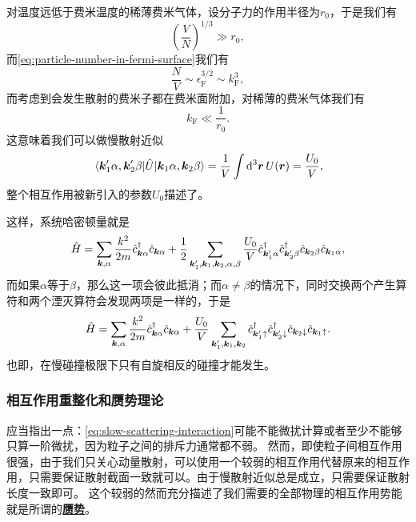 \documentclass[hyperref, UTF8, a4paper]{ctexart}
\newcommand{\concept}[1]{\underline{\textbf{#1}}}
\begin{document}
对温度远低于费米温度的稀薄费米气体，设分子力的作用半径为$r_0$，于是我们有
\[
    \left( \frac{V}{N} \right)^{1/3} \gg r_0,
\]
而\eqref{eq:particle-number-in-fermi-surface}我们有
\[
    \frac{N}{V} \sim \epsilon_\text{F}^{3/2} \sim k_\text{F}^{3},
\]
而考虑到会发生散射的费米子都在费米面附加，对稀薄的费米气体我们有
\begin{equation}
    k_\text{F} \ll \frac{1}{r_0}.
\end{equation}
这意味着我们可以做慢散射近似
\begin{equation}
    \mel*{\vb*{k}_1' \alpha, \vb*{k}_2' \beta}{\hat{U}}{\vb*{k}_1 \alpha, \vb*{k}_2 \beta} = \frac{1}{V} \int \dd[3]{\vb*{r}} U(\vb*{r}) = \frac{U_0}{V},
    \label{eq:slow-scattering-interaction}
\end{equation}
整个相互作用被新引入的参数$U_0$描述了。

这样，系统哈密顿量就是
\[
    \hat{H} = \sum_{\vb*{k}, \alpha} \frac{k^2}{2m} \hat{c}^\dagger_{\vb*{k} \alpha} \hat{c}_{\vb*{k} \alpha} + \frac{1}{2} \sum_{\vb*{k}_1', \vb*{k}_1, \vb*{k}_2, \alpha, \beta} \frac{U_0}{V} \hat{c}^\dagger_{\vb*{k}'_1 \alpha} \hat{c}^\dagger_{\vb*{k}'_2 \beta} \hat{c}_{\vb*{k}_2 \beta} \hat{c}_{\vb*{k}_1 \alpha},
\]
而如果$\alpha$等于$\beta$，那么这一项会彼此抵消；而$\alpha \neq \beta$的情况下，同时交换两个产生算符和两个湮灭算符会发现两项是一样的，于是
\begin{equation}
    \hat{H} = \sum_{\vb*{k}, \alpha} \frac{k^2}{2m} \hat{c}^\dagger_{\vb*{k} \alpha} \hat{c}_{\vb*{k} \alpha} + \frac{U_0}{V} \sum_{\vb*{k}_1', \vb*{k}_1, \vb*{k}_2} \hat{c}^\dagger_{\vb*{k}'_1 \uparrow} \hat{c}^\dagger_{\vb*{k}'_2 \downarrow} \hat{c}_{\vb*{k}_2 \downarrow} \hat{c}_{\vb*{k}_1 \uparrow}.
\end{equation}
也即，在慢碰撞极限下只有自旋相反的碰撞才能发生。

\subsubsection{相互作用重整化和赝势理论}

应当指出一点：\eqref{eq:slow-scattering-interaction}可能不能微扰计算或者至少不能够只算一阶微扰，因为粒子之间的排斥力通常都不弱。
然而，即使粒子间相互作用很强，由于我们只关心动量散射，可以使用一个较弱的相互作用代替原来的相互作用，只需要保证散射截面一致就可以。由于慢散射近似总是成立，只需要保证散射长度一致即可。
这个较弱的然而充分描述了我们需要的全部物理的相互作用势能就是所谓的\concept{赝势}。
\end{document}
